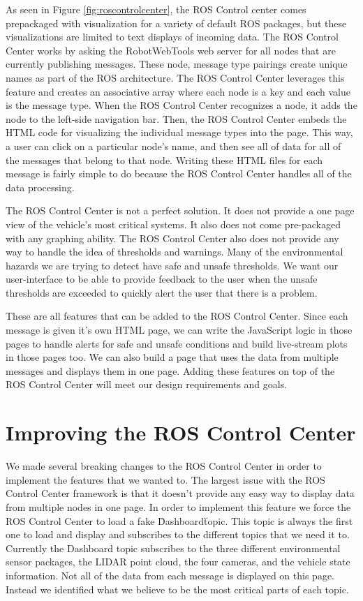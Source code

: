 As seen in Figure \ref{fig:roscontrolcenter}, the ROS Control center comes prepackaged with visualization for a variety of default ROS packages, but these visualizations are limited to text displays of incoming data.  The ROS Control Center works by asking the RobotWebTools web server for all nodes that are currently publishing messages.  These node, message type pairings create unique names as part of the ROS architecture.  The ROS Control Center leverages this feature and creates an associative array where each node is a key and each value is the message type.  When the ROS Control Center recognizes a node, it adds the node to the left-side navigation bar.  Then, the ROS Control Center embeds the HTML code for visualizing the individual message types into the page.  This way, a user can click on a particular node's name, and then see all of data for all of the messages that belong to that node.  Writing these HTML files for each message is fairly simple to do because the ROS Control Center handles all of the data processing.

The ROS Control Center is not a perfect solution.  It does not provide a one page view of the vehicle's most critical systems.  It also does not come pre-packaged with any graphing ability.  The ROS Control Center also does not provide any way to handle the idea of thresholds and warnings. Many of the environmental hazards we are trying to detect have safe and unsafe thresholds.  We want our user-interface to be able to provide feedback to the user when the unsafe thresholds are exceeded to quickly alert the user that there is a problem.

These are all features that can be added to the ROS Control Center.  Since each message is given it's own HTML page, we can write the JavaScript logic in those pages to handle alerts for safe and unsafe conditions and build live-stream plots in those pages too.  We can also build a page that uses the data from multiple messages and displays them in one page.  Adding these features on top of the ROS Control Center will meet our design requirements and goals.

\section{Improving the ROS Control Center}
We made several breaking changes to the ROS Control Center in order to implement the features that we wanted to.  The largest issue with the ROS Control Center framework is that it doesn't provide any easy way to display data from multiple nodes in one page.  In order to implement this feature we force the ROS Control Center to load a fake \"Dashboard\" topic.  This topic is always the first one to load and display and subscribes to the different topics that we need it to.  Currently the Dashboard topic subscribes to the three different environmental sensor packages, the LIDAR point cloud, the four cameras, and the vehicle state information.  Not all of the data from each message is displayed on this page.  Instead we identified what we believe to be the most critical parts of each topic.  

